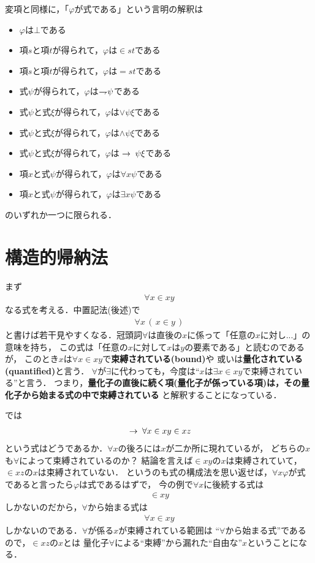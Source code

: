 	変項と同様に，「$\varphi$が式である」という言明の解釈は
	\begin{itemize}
		\item $\varphi$は$\bot$である
		\item 項$s$と項$t$が得られて，$\varphi$は$\in s t$である
		\item 項$s$と項$t$が得られて，$\varphi$は$= s t$である
		\item 式$\psi$が得られて，$\varphi$は$\rightharpoondown\hspace{-0.25em} \psi$である
		\item 式$\psi$と式$\xi$が得られて，$\varphi$は$\vee \psi \xi$である
		\item 式$\psi$と式$\xi$が得られて，$\varphi$は$\wedge \psi \xi$である
		\item 式$\psi$と式$\xi$が得られて，$\varphi$は$\hspace{0.25em}\rightarrow\hspace{0.25em} \psi \xi$である
		\item 項$x$と式$\psi$が得られて，$\varphi$は$\forall x \psi$である
		\item 項$x$と式$\psi$が得られて，$\varphi$は$\exists x \psi$である
	\end{itemize}
	のいずれか一つに限られる．
	
\section{構造的帰納法}
	まず
	\begin{align}
		\forall x \in x y
	\end{align}
	なる式を考える．中置記法(後述)で
	\begin{align}
		\forall x\, (\, x \in y\, )
	\end{align}
	と書けば若干見やすくなる．冠頭詞$\forall$は直後の$x$に係って「任意の$x$に対し...」の意味を持ち，
	この式は「任意の$x$に対して$x$は$y$の要素である」と読むのであるが，
	このとき$x$は$\forall x \in x y$で{\bf 束縛されている}{\bf (bound)}や
	或いは{\bf 量化されている}{\bf (quantified)}と言う．
	$\forall$が$\exists$に代わっても，今度は``$x$は$\exists x \in x y$で束縛されている''と言う．
	つまり，{\bf 量化子の直後に続く項(量化子が係っている項)は，その量化子から始まる式の中で束縛されている}
	と解釈することになっている．
	
	では
	\begin{align}
		\hspace{0.25em}\rightarrow\hspace{0.25em} \forall x \in x y \in x z
	\end{align}
	という式はどうであるか．$\forall x$の後ろには$x$が二か所に現れているが，
	どちらの$x$も$\forall$によって束縛されているのか？
	結論を言えば$\in x y$の$x$は束縛されていて，$\in x z$の$x$は束縛されていない．
	というのも式の構成法を思い返せば，$\forall x \varphi$が式であると言ったら$\varphi$は式であるはずで，
	今の例で$\forall x$に後続する式は
	\begin{align}
		\in x y
	\end{align}
	しかないのだから，$\forall$から始まる式は
	\begin{align}
		\forall x \in x y
	\end{align}
	しかないのである．$\forall$が係る$x$が束縛されている範囲は
	``$\forall$から始まる式''であるので，$\in x z$の$x$とは
	量化子$\forall$による``束縛''から漏れた``自由な''$x$ということになる．
	
